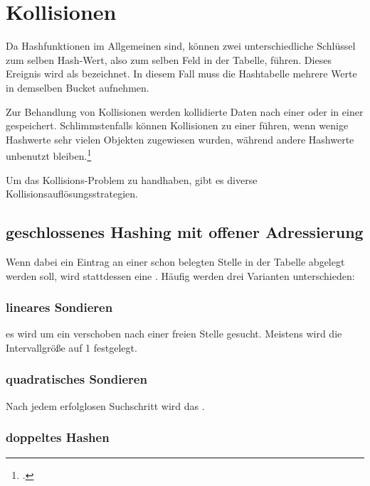 \documentclass{bschlangaul-theorie}
\begin{document}
\section{Kollisionen}

Da Hashfunktionen im Allgemeinen 
sind, können zwei unterschiedliche Schlüssel zum selben Hash-Wert, also
zum selben Feld in der Tabelle, führen. Dieses Ereignis wird als
 bezeichnet. In diesem Fall muss die Hashtabelle
mehrere Werte in demselben Bucket aufnehmen.

Zur Behandlung von Kollisionen werden kollidierte Daten nach einer
 oder in einer
 gespeichert. Schlimmstenfalls können Kollisionen zu einer
 führen, wenn wenige Hashwerte sehr
vielen Objekten zugewiesen wurden, während andere Hashwerte unbenutzt
bleiben.\footcite{wiki:hashtabelle}

Um das Kollisions-Problem zu handhaben, gibt es diverse
Kollisionsauflösungsstrategien.

%

\subsection{geschlossenes Hashing mit offener Adressierung}

Wenn dabei ein Eintrag an einer schon belegten Stelle in der
Tabelle abgelegt werden soll, wird stattdessen eine . Häufig werden drei Varianten unterschieden:

\subsubsection{lineares Sondieren}

es wird um ein  verschoben nach einer freien
Stelle gesucht. Meistens wird die Intervallgröße auf 1 festgelegt.

\subsubsection{quadratisches Sondieren}

Nach jedem erfolglosen Suchschritt wird das .

\subsubsection{doppeltes Hashen}
\end{document}
